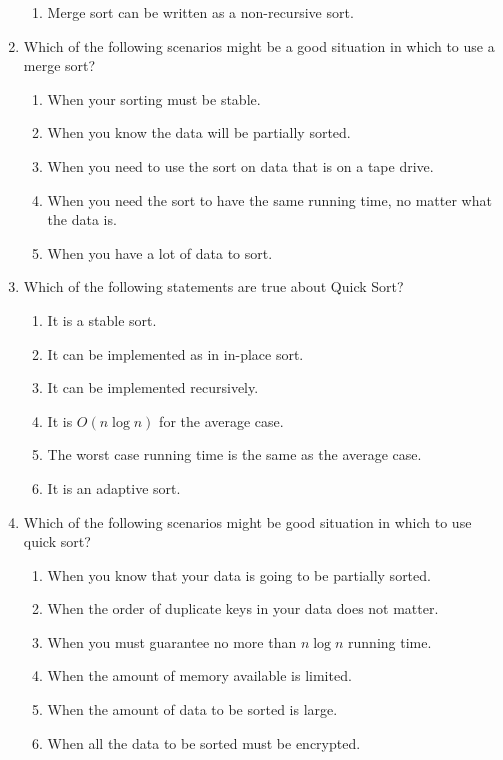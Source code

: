 \documentclass{article}
\begin{document}
\begin{enumerate}
\begin{enumerate}[label=\alph*.]
			\item Merge sort can be written as a non-recursive sort.
		\end{enumerate}
	\item Which of the following scenarios might be a good situation in which to use a merge sort?
		\begin{enumerate}[label=\alph*.]
			\item When your sorting must be stable.
			\item When you know the data will be partially sorted.
			\item When you need to use the sort on data that is on a tape drive.
			\item When you need the sort to have the same running time, no matter what the data is.
			\item When you have a lot of data to sort.
		\end{enumerate}
	\item Which of the following statements are true about Quick Sort?
		\begin{enumerate}[label=\alph*.]
			\item It is a stable sort.
			\item It can be implemented as in in-place sort.
			\item It can be implemented recursively.
			\item It is \(O(n \log n)\) for the average case.
			\item The worst case running time is the same as the average case.
			\item It is an adaptive sort.
		\end{enumerate}
	\item Which of the following scenarios might be good situation in which to use quick sort?
		\begin{enumerate}[label=\alph*.]
			\item When you know that your data is going to be partially sorted.
			\item When the order of duplicate keys in your data does not matter.
			\item When you must guarantee no more than \(n \log n\) running time.
			\item When the amount of memory available is limited.
			\item When the amount of data to be sorted is large.
			\item When all the data to be sorted must be encrypted.
		\end{enumerate}
\end{enumerate}
\end{document}
